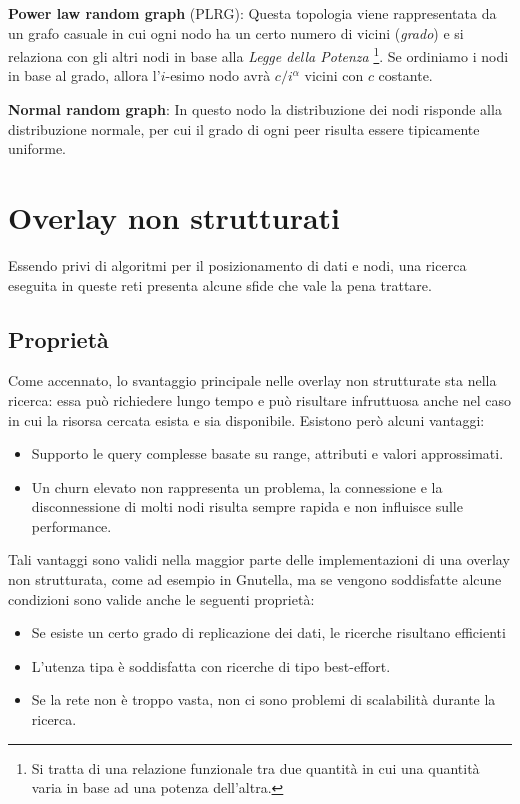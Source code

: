 \textbf{Power law random graph} (PLRG): Questa topologia viene rappresentata da un grafo casuale in cui ogni nodo ha un certo numero di vicini (\emph{grado}) e si relaziona con gli altri nodi in base alla
\emph{Legge della Potenza} \footnote{Si tratta di una relazione   funzionale tra due quantità in cui una quantità varia in base ad una   potenza dell'altra.}. Se ordiniamo i nodi in base al grado, allora l'$i$-esimo nodo avrà $c/i^\alpha$ vicini con $c$ costante.

\textbf{Normal random graph}: In questo nodo la distribuzione dei nodi risponde alla distribuzione normale, per cui il grado di ogni peer risulta essere tipicamente uniforme.

\section{Overlay non strutturati}\label{overlay-non-strutturati}

Essendo privi di algoritmi per il posizionamento di dati e nodi, una ricerca eseguita in queste reti presenta alcune sfide che vale la pena trattare.

\subsection{Proprietà}\label{proprietuxe0}

Come accennato, lo svantaggio principale nelle overlay non strutturate sta nella ricerca: essa può richiedere lungo tempo e può risultare infruttuosa anche nel caso in cui la risorsa cercata esista e sia disponibile. Esistono però alcuni vantaggi:

\begin{itemize}
\itemsep1pt\parskip0pt
\item
  Supporto le query complesse basate su range, attributi e valori   approssimati.
\item
  Un \gls{churn} elevato non rappresenta un problema, la connessione e la   disconnessione di molti nodi risulta sempre rapida e non influisce   sulle performance.
\end{itemize}

Tali vantaggi sono validi nella maggior parte delle implementazioni di una overlay non strutturata, come ad esempio in Gnutella, ma se vengono soddisfatte alcune condizioni sono valide anche le seguenti proprietà: 
\begin{itemize}
\itemsep1pt\parskip0pt
\item
  Se esiste un certo grado di replicazione dei dati, le ricerche   risultano efficienti
\item
  L'utenza tipa è soddisfatta con ricerche di tipo best-effort.
\item
  Se la rete non è troppo vasta, non ci sono problemi di scalabilità   durante la ricerca.
\end{itemize}

